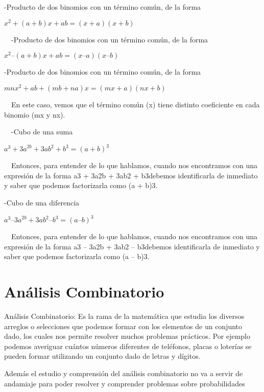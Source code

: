 \documentclass{article}
\begin{document}
{}-Producto de dos binomios con un t\'ermino com\'un, de la forma

 $x^{2}+(a+b)x+ab=(x+a)(x+b)$


\bigskip


\bigskip

\ \ {}-Producto de dos binomios con un t\'ermino com\'un, de la forma

 $x^{2}\text{--}(a+b)x+ab=(x\text{--}a)(x\text{--}b)$


\bigskip

{}-Producto de dos binomios con un t\'ermino com\'un, de la forma

 ${mnx}^{2}+ab+(mb+na)x=(mx+a)(nx+b)$

\ \ En este caso, vemos que el t\'ermino com\'un (x) tiene distinto coeficiente en cada binomio (mx y nx).


\bigskip

\ \ {}-Cubo de una suma

 $a^{3}+{3a}^{2b}+{3ab}^{2}+b^{3}={(a+b)}^{3}$

\ \ Entonces, para entender de lo que hablamos, cuando nos encontramos con una expresi\'on de la forma a3 + 3a2b + 3ab2 + b3debemos identificarla de inmediato y saber que podemos factorizarla como (a + b)3.


\bigskip


\bigskip

{}-Cubo de una diferencia

 $a^{3}\text{--}{3a}^{2b}+{3ab}^{2}\text{--}b^{3}={(a\text{--}b)}^{3}$

\ \ Entonces, para entender de lo que hablamos, cuando nos encontramos con una expresi\'on de la forma a3 -- 3a2b + 3ab2 -- b3debemos identificarla de inmediato y saber que podemos factorizarla como (a -- b)3.


\bigskip

\section[An\'alisis Combinatorio]{An\'alisis Combinatorio}
An\'alisis Combinatorio: Es la rama de la matem\'atica que estudia los diversos arreglos o selecciones que podemos formar con los elementos de un conjunto dado, los cuales nos permite resolver muchos problemas pr\'acticos. Por ejemplo podemos averiguar cu\'antos n\'umeros diferentes de tel\'efonos, placas o loter\'ias se pueden formar utilizando un conjunto dado de letras y d\'igitos.

Adem\'as el estudio y comprensi\'on del an\'alisis combinatorio no va a servir de andamiaje para poder resolver y comprender problemas sobre probabilidades
\end{document}
